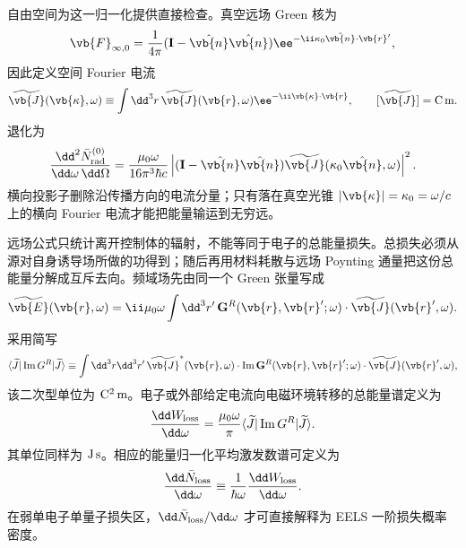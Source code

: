 自由空间为这一归一化提供直接检查。真空远场 Green 核为
\begin{equation*}
\vb{F}_{\infty,0}
=\frac{1}{4\pi}
(\mathbf I-\hat{\vb{n}}\hat{\vb{n}})
\ee^{-\ii\kappa_0\hat{\vb{n}}\cdot\vb{r}'},
\end{equation*}
因此定义空间 Fourier 电流
\begin{equation*}
\widetilde{\vb{J}}(\vb{\kappa},\omega)
\equiv
\int\dd^3 r\,\widetilde{\vb{J}}(\vb{r},\omega)
\ee^{-\ii\vb{\kappa}\cdot\vb{r}},
\qquad
[\widetilde{\vb{J}}]={\rm C\,m}.
\end{equation*}
 退化为
\begin{equation}
{
\frac{\dd^2 \bar N_{\rm rad}^{(0)}}{\dd\omega\,\dd\Omega}
=
\frac{\mu_0\omega}{16\pi^3\hbar c}
\left|
(\mathbf I-\hat{\vb{n}}\hat{\vb{n}})
\widetilde{\vb{J}}(\kappa_0\hat{\vb{n}},\omega)
\right|^2.}
\label{eq:free_space_current_radiation_probability}
\end{equation}
横向投影子删除沿传播方向的电流分量；只有落在真空光锥 $|\vb{\kappa}|=\kappa_0=\omega/c$ 上的横向 Fourier 电流才能把能量输运到无穷远。

远场公式只统计离开控制体的辐射，不能等同于电子的总能量损失。总损失必须从源对自身诱导场所做的功得到；随后再用材料耗散与远场 Poynting 通量把这份总能量分解成互斥去向。频域场先由同一个 Green 张量写成
\begin{equation}
{
\widetilde{\vb{E}}(\vb{r},\omega)
=\ii\mu_0\omega\int\dd^3 r'\,
\mathbf G^R(\vb{r},\vb{r}';\omega)\cdot
\widetilde{\vb{J}}(\vb{r}',\omega).}
\label{eq:eels_source_field_green_dp68}
\end{equation}
采用简写
\begin{equation*}
\langle \widetilde J|\operatorname{Im}G^R|\widetilde J\rangle
\equiv
\int\dd^3 r\dd^3 r'\,
\widetilde{\vb{J}}^{*}(\vb{r},\omega)\cdot
\operatorname{Im}\mathbf G^R(\vb{r},\vb{r}';\omega)
\cdot\widetilde{\vb{J}}(\vb{r}',\omega),
\end{equation*}
该二次型单位为 ${\rm C^2\,m}$。电子或外部给定电流向电磁环境转移的总能量谱定义为
\begin{equation}
{
\frac{\dd W_{\rm loss}}{\dd\omega}
=
\frac{\mu_0\omega}{\pi}
\langle \widetilde J|\operatorname{Im}G^R|\widetilde J\rangle.}
\label{eq:eels_energy_loss_green_si}
\end{equation}
其单位同样为 ${\rm J\,s}$。相应的能量归一化平均激发数谱可定义为
\begin{equation*}
\frac{\dd\bar N_{\rm loss}}{\dd\omega}
\equiv
\frac{1}{\hbar\omega}
\frac{\dd W_{\rm loss}}{\dd\omega}.
\end{equation*}
在弱单电子单量子损失区，$\dd\bar N_{\rm loss}/\dd\omega$ 才可直接解释为 EELS 一阶损失概率密度。

